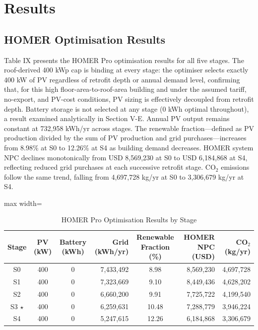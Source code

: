 \documentclass[journal,fleqn]{IEEEtran}
\renewcommand{\arraystretch}{1.08}
\begin{document}
\section{Results}

\subsection{HOMER Optimisation Results}

Table IX presents the HOMER Pro optimisation results for all five stages. The roof-derived 400 kWp cap is binding at every stage: the optimiser selects exactly 400 kW of PV regardless of retrofit depth or annual demand level, confirming that, for this high floor-area-to-roof-area building and under the assumed tariff, no-export, and PV-cost conditions, PV sizing is effectively decoupled from retrofit depth. Battery storage is not selected at any stage (0 kWh optimal throughout), a result examined analytically in Section V-E. Annual PV output remains constant at 732,958 kWh/yr across stages. The renewable fraction---defined as PV production divided by the sum of PV production and grid purchases---increases from 8.98\% at S0 to 12.26\% at S4 as building demand decreases. HOMER system NPC declines monotonically from USD 8,569,230 at S0 to USD 6,184,868 at S4, reflecting reduced grid purchases at each successive retrofit stage. CO$_{2}$ emissions follow the same trend, falling from 4,697,728 kg/yr at S0 to 3,306,679 kg/yr at S4.


\begin{table}[!t]
\caption{HOMER Pro Optimisation Results by Stage}
\label{tab:09}
\centering
\scriptsize
\setlength{\tabcolsep}{4pt}
\renewcommand{\arraystretch}{1.16}
\begin{adjustbox}{max width=\textwidth}
\begin{tabular}{@{}cccrcrr@{}}
\toprule
\textbf{Stage} & \textbf{PV (kW)} & \textbf{Battery (kWh)} & \textbf{Grid (kWh/yr)} & \textbf{Renewable Fraction (\%)} & \textbf{HOMER NPC (USD)} & \textbf{CO$_{2}$ (kg/yr)} \\
\midrule
S0 & 400 & 0 & 7,433,492 & 8.98 & 8,569,230 & 4,697,728 \\
S1 & 400 & 0 & 7,323,669 & 9.10 & 8,449,436 & 4,628,202 \\
S2 & 400 & 0 & 6,660,200 & 9.91 & 7,725,722 & 4,199,540 \\
S3 $\star$ & 400 & 0 & 6,259,631 & 10.48 & 7,288,779 & 3,946,224 \\
S4 & 400 & 0 & 5,247,615 & 12.26 & 6,184,868 & 3,306,679 \\
\bottomrule
\end{tabular}
\end{adjustbox}
\end{table}
\end{document}
